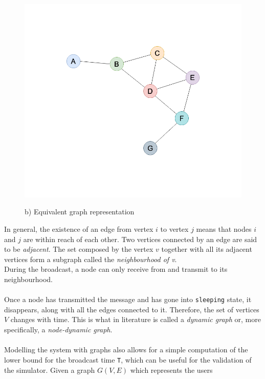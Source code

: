 \begin{figure}[H]
\begin{minipage}{.5\textwidth}
		\includegraphics[scale=.23]{img/wireless_graph_2.png}
		\begin{center}
            b) Equivalent graph representation
        \end{center}
	\end{minipage}
	\caption{}
    \label{fig:graph1}
\end{figure}
\noindent
In general, the existence of an edge from vertex $i$ to vertex $j$ means that
nodes $i$ and $j$ are within reach of each other. Two vertices connected by an
edge are said to be \textit{adjacent}. The set composed by the vertex $v$
together with all its adjacent vertices form a subgraph called the
\textit{neighbourhood of v}.\\
During the broadcast, a node can only receive from and transmit to its
neighbourhood.\\
\\
Once a node has transmitted the message and has gone into \texttt{sleeping}
state, it disappears, along with all the edges connected to it. Therefore, the
set of vertices $V$ changes with time. This is what in literature is called a
\textit{dynamic graph} or, more specifically, a
\textit{node-dynamic graph}\cite{harrygraph}.\\
\\
Modelling the system with graphs also allows for a simple computation of the
lower bound for the broadcast time \texttt{T}, which can be useful for the
validation of the simulator. Given a graph $G(V, E)$ which represents the users
